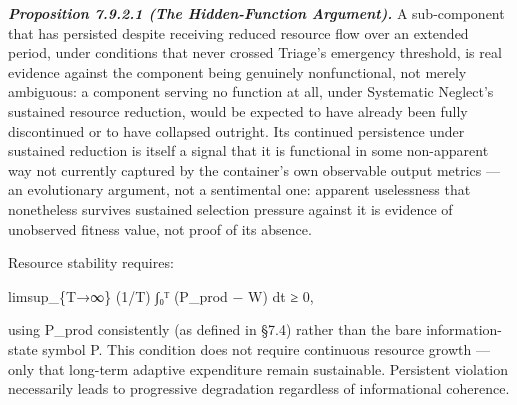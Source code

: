\documentclass[
]{article}
\begin{document}
\emph{\textbf{Proposition 7.9.2.1 (The Hidden-Function Argument).}} A
sub-component that has persisted despite receiving reduced resource flow
over an extended period, under conditions that never crossed Triage's
emergency threshold, is real evidence against the component being
genuinely nonfunctional, not merely ambiguous: a component serving no
function at all, under Systematic Neglect's sustained resource
reduction, would be expected to have already been fully discontinued or
to have collapsed outright. Its continued persistence under sustained
reduction is itself a signal that it is functional in some non-apparent
way not currently captured by the container's own observable output
metrics --- an evolutionary argument, not a sentimental one: apparent
uselessness that nonetheless survives sustained selection pressure
against it is evidence of unobserved fitness value, not proof of its
absence.

Resource stability requires:

limsup\_\{T→∞\} (1/T) ∫₀ᵀ (P\_prod − W) dt ≥ 0,

using P\_prod consistently (as defined in §7.4) rather than the bare
information-state symbol P. This condition does not require continuous
resource growth --- only that long-term adaptive expenditure remain
sustainable. Persistent violation necessarily leads to progressive
degradation regardless of informational coherence.
\end{document}
